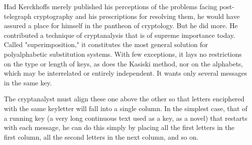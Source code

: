 Had Kerckhoffs merely published his perceptions of the problems facing post-telegraph cryptography and his prescriptions for resolving them, he would have assured a place for himself in the pantheon of cryptology. But he did more. He contributed a technique of cryptanalysis that is of supreme importance today. Called "superimposition," it constitutes the most general solution for polyalphabetic substitution systems. With few exceptions, it lays no restrictions on the type or length of keys, as does the Kasiski method, nor on the alphabets, which may be interrelated or entirely independent. It wants only several messages in the same key.

The cryptanalyst must align these one above the other so that letters enciphered with the same keyletter will fall into a single column. In the simplest case, that of a running key (a very long continuous text used as a key, as a novel) that restarts with each message, he can do this simply by placing all the first letters in the first column, all the second letters in the next column, and so on.
